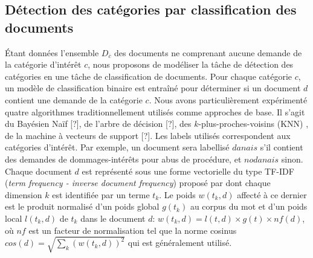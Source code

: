 \subsection{Détection des catégories par classification des documents}

Étant données l'ensemble $D_{\overline{c}}$ des documents ne comprenant aucune demande de la catégorie d'intérêt $c$, nous proposons de modéliser la tâche de détection des catégories en une tâche de classification de documents. Pour chaque catégorie $c$, un modèle de classification binaire est entraîné pour déterminer si un document $d$ contient une demande de la catégorie $c$. Nous avons particulièrement expérimenté quatre algorithmes traditionnellement utilisés comme approches de base. Il s'agit du Bayésien Naïf [?], de l'arbre de décision [?], des $k$-plus-proches-voisins (KNN) \citep{cover1967knn}, de la machine à vecteurs de support [?]. Les labels utilisés correspondent aux catégories d'intérêt. Par exemple, un document sera labellisé $danais$ s'il contient des demandes de dommages-intérêts pour abus de procédure, et $nodanais$ sinon. Chaque document $d$ est représenté sous une forme vectorielle du type TF-IDF (\textit{term frequency - inverse document frequency}) proposé par \cite{salton1988term-weighting} dont chaque dimension $k$ est identifiée par un terme $t_k$. Le poids $w(t_k, d)$ affecté à ce dernier est le produit normalisé d'un poids global $g(t_k)$ au corpus du mot et d'un poids local $l(t_k,d)$ de $t_k$ dans le document $d$: $w(t_k, d) = l(t,d) \times g(t) \times nf(d)$, où $nf$ est un facteur de normalisation tel que la norme cosinus $cos(d) = \sqrt{\sum\limits_k (w(t_k,d))^2}$ qui est généralement utilisé. 

